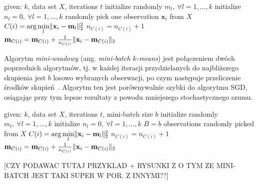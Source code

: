 \documentclass{praca1}
\DeclarePairedDelimiter{\norm}{\lVert}{\rVert}
\begin{document}
\begin{algorithm}[h!]
\begin{algorithmic}[1]
		\State given: $k$, data set $X$, iterations $t$
        \State initialize randomly $m_l, \ \forall l=1, ..., k$
        \State initialize $n_l = 0, \ \forall l=1, ..., k$
        \Repeat
        	\State randomly pick one observation $\mathbf{x}_i$ from $X$
                \State $C(i) = \arg \min\limits_{l} \norm{\mathbf{x}_i - \mathbf{m}_l }_2^2 $
                \State $n_{C(i)} = n_{C(i)} + 1$
                \State $\mathbf{m}_{C(i)} = \mathbf{m}_{C(i)} + \frac{1}{n_{C(i)}}\norm{\mathbf{x}_i - \mathbf{m}_{C(i)}}_2$
\end{algorithmic}
\caption{Algorytm SGD $k$-średnich}\label{alg:002}
\end{algorithm}

Algorytm \emph{mini-wsadowy} (ang. \emph{mini-batch $k$-means}) jest połączeniem dwóch poprzednich algorytmów, tj. w każdej iteracji przydzielanych do najbliższego skupienia jest $b$ losowo wybranych obserwacji, po czym następuje przeliczenie środków skupień~\cite{Sculley2010:webkmeans}. Algorytm ten jest porównywalnie szybki do algorytmu SGD, osiągając przy tym lepsze rezultaty z powodu mniejszego stochastycznego szumu.

\begin{algorithm}[h!]
\begin{algorithmic}[1]
		\State given: $k$, data set $X$, iterations $t$, mini-batch size $b$
        \State initialize randomly $m_l, \ \forall l=1, ..., k$
        \State initialize $n_l = 0, \ \forall l=1, ..., k$
        \Repeat
        	\State $B = b$ observations randomly picked from $X$
                \State $C(i) = \arg \min\limits_{l} \norm{\mathbf{x}_i - \mathbf{m}_l }_2^2 $
            \EndFor
                \State $n_{C(i)} = n_{C(i)} + 1$
                \State $\mathbf{m}_{C(i)} = \mathbf{m}_{C(i)} + \frac{1}{n_{C(i)}}\norm{\mathbf{x}_i - \mathbf{m}_{C(i)}}_2$
            \EndFor
\end{algorithmic}
\caption{Algorytm mini-wsadowy $k$-średnich}\label{alg:003}
\end{algorithm}

[CZY PODAWAC TUTAJ PRZYKLAD + RYSUNKI Z \cite{Sculley2010:webkmeans} O TYM ZE MINI-BATCH JEST TAKI SUPER W POR. Z INNYMI??]
\end{document}
